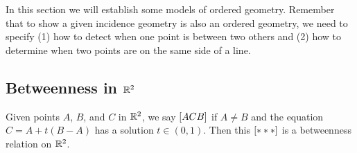 In this section we will establish some models of ordered geometry.
Remember that to show a given incidence geometry is also an ordered geometry, we need to specify (1) how to detect when one point is between two others and (2) how to determine when two points are on the same side of a line.

\subsection{Betweenness in \(\mathbb{R}^2\)}

\begin{prop}
Given points \(A\), \(B\), and \(C\) in \(\mathbb{R}^2\), we say \([ A C B ]\) if \(A \neq B\) and the equation \(C = A + t(B-A)\) has a solution \(t \in (0,1)\).
Then this \([ \ast \ast \ast ]\) is a betweenness relation on \(\mathbb{R}^2\).
\end{prop}

